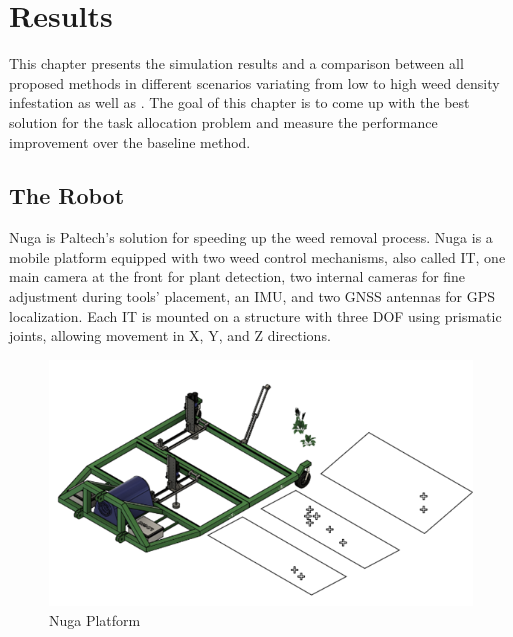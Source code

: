 \chapter{Results}\label{ch:Results}
This chapter presents the simulation results and a comparison between all proposed methods in different scenarios variating from low to high weed density infestation as well as . The goal of this chapter is to come up with the best solution for the task allocation problem and measure the performance improvement over the baseline method.

\section{The Robot}\label{sec:nuga}
Nuga is Paltech's solution for speeding up the weed removal process. Nuga is a mobile platform equipped with two weed control mechanisms, also called \ac{IT}, one main camera at the front for plant detection, two internal cameras for fine adjustment during tools' placement, an IMU, and two GNSS antennas for GPS localization. Each \ac{IT} is mounted on a structure with three \ac{DOF} using prismatic joints, allowing movement in X, Y, and Z directions.

\begin{figure}[bth]
    \centering
    \includegraphics[width=0.7\linewidth]{gfx/ch03/nuga_cad.png}
    \caption{Nuga Platform}
    \label{fig:nuga-cad}
\end{figure}





